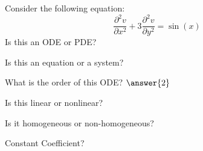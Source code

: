 \documentclass{ximera}
\begin{document}
\begin{exercise}
    Consider the following equation:  
    \[
        \frac{\partial^2 v}{\partial x^2} + 3 \frac{\partial^2 v}{\partial y^2} = \sin(x)
    \]
    Is this an ODE or PDE?
    \begin{multipleChoice}
    \end{multipleChoice}
    \begin{problem}
        Is this an equation or a system?
        \begin{multipleChoice}
        \end{multipleChoice}
        
        \begin{problem}
            What is the order of this ODE? $\answer{2}$
            
            \begin{problem}
                Is this linear or nonlinear?
                \begin{multipleChoice}
                \end{multipleChoice}
                
                \begin{problem}
                    Is it homogeneous or non-homogeneous?
                    \begin{multipleChoice}
                    \end{multipleChoice}
                    
                    \begin{problem}
                        Constant Coefficient?
                        \begin{multipleChoice}
                        \end{multipleChoice}
                    \end{problem}
                \end{problem}
            \end{problem}
        \end{problem}
    \end{problem}
\end{exercise}
\end{document}
